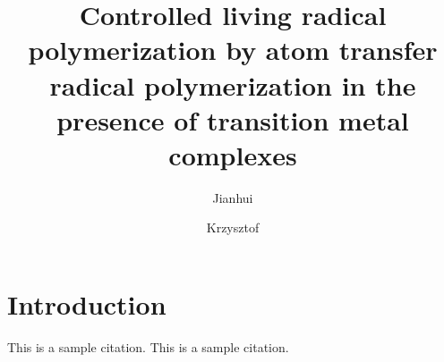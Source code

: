\documentclass[10pt,aps,pre,raggedfooter,twocolumn,twoside,longbibliography,floatfix,superscriptaddress]{revtex4-1}
\begin{document}
\title{Controlled living radical polymerization by atom transfer radical polymerization in the presence of transition metal complexes}
\author{Jianhui }
\author{Krzysztof }\vspace*{3.5mm}

\maketitle

\setcounter{page}{1} %

\section{Introduction} \label{sec:intro}
\thispagestyle{frontmatter} %
\blindtext
This is a sample citation\cite{bitsanis1990}.
\blindtext
This is a sample citation\cite{baschnagel1999mrssp}.
\end{document}
